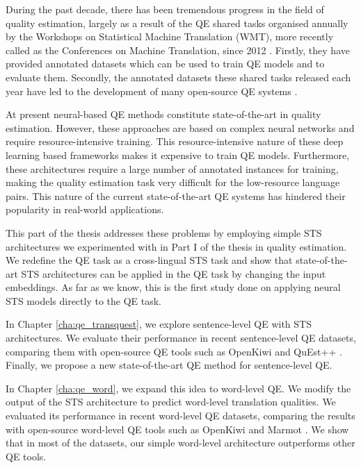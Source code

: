 During the past decade, there has been tremendous progress in the field of quality estimation, largely as a result of the QE shared tasks organised annually by the Workshops on Statistical Machine Translation (WMT), more recently called as the Conferences on Machine Translation, since 2012  \autocite{callison-burch-etal-2012-findings,bojar-etal-2013-findings,bojar-etal-2014-findings,bojar-etal-2015-findings,bojar-etal-2016-findings,bojar-etal-2017-findings,specia-etal-2018-findings,fonseca-etal-2019-findings,specia-etal-2020-findings-wmt}. Firstly, they have provided annotated datasets which can be used to train QE models and to evaluate them. Secondly, the annotated datasets these shared tasks released each year have led to the development of many open-source QE systems \autocite{specia-etal-2015-multi, ive-etal-2018-deepquest, kepler-etal-2019-openkiwi}. 

At present neural-based QE methods constitute state-of-the-art in quality estimation. However, these approaches are based on complex neural networks and require resource-intensive training. This resource-intensive nature of these deep learning based frameworks makes it expensive to train QE models. Furthermore, these architectures require a large number of annotated instances for training, making the quality estimation task very difficult for the low-resource language pairs. This nature of the current state-of-the-art QE systems has hindered their popularity in real-world applications.

This part of the thesis addresses these problems by employing simple STS architectures we experimented with in Part I of the thesis in quality estimation. We redefine the QE task as a cross-lingual STS task and show that state-of-the-art STS architectures can be applied in the QE task by changing the input embeddings. As far as we know, this is the first study done on applying neural STS models directly to the QE task. 

In Chapter \ref{cha:qe_transquest}, we explore sentence-level QE with STS architectures. We evaluate their performance in recent sentence-level QE datasets, comparing them with open-source QE tools such as OpenKiwi \autocite{kepler-etal-2019-openkiwi} and QuEst++ \autocite{specia-etal-2015-multi}. Finally, we propose a new state-of-the-art QE method for sentence-level QE.

In Chapter \ref{cha:qe_word}, we expand this idea to word-level QE. We modify the output of the STS architecture to predict word-level translation qualities. We evaluated its performance in recent word-level QE datasets, comparing the results with open-source word-level QE tools such as OpenKiwi \autocite{kepler-etal-2019-openkiwi} and Marmot \autocite{logacheva-etal-2016-marmot}. We show that in most of the datasets, our simple word-level architecture outperforms other QE tools. 

